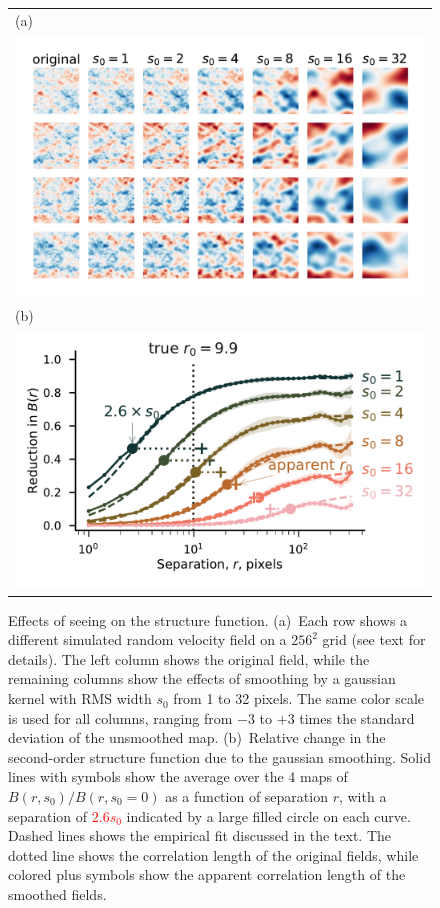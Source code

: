\documentclass[fleqn,usenatbib, useAMS, a4paper]{mnras}
\begin{document}
\begin{figure}
  \begin{tabular}{@{} l @{}}
    (a)\\
    \includegraphics[width=\linewidth]{Figures/fake-3d-seeing-nonp-ems-fluct-thumbnails_sigE_1}\\
    (b)\\
    \includegraphics[width=\linewidth]{Figures/fake-seeing-nonp-3d-ems-fluc_m4-reduction_sigE_1}
  \end{tabular}
  \caption{Effects of seeing on the structure function.
    (a)~Each row shows a different simulated random velocity field
    on a \(256^2\) grid (see text for details).
    The left column shows the original field,
    while the remaining columns show the effects of smoothing by a gaussian kernel
    with RMS width \(s_0\) from 1 to 32 pixels.
    The same color scale is used for all columns, ranging from \(-3\) to \(+3\) times
    the standard deviation of the unsmoothed map.
    (b)~Relative change in the second-order structure function due to the gaussian smoothing.
    Solid lines with symbols show the average over the 4 maps of
    \(B(r, s_0) / B(r, s_0 = 0)\) as a function of separation \(r\),
    with a separation of \textcolor{red}{\(2.6 s_0\)} indicated by a large filled circle on each curve.
    Dashed lines shows the empirical fit discussed in the text.
    The dotted line shows the correlation length of the original fields,
    while colored plus symbols show the apparent correlation length of the smoothed fields.
  }
  \label{fig:seeing-reduction}
\end{figure}
\end{document}
